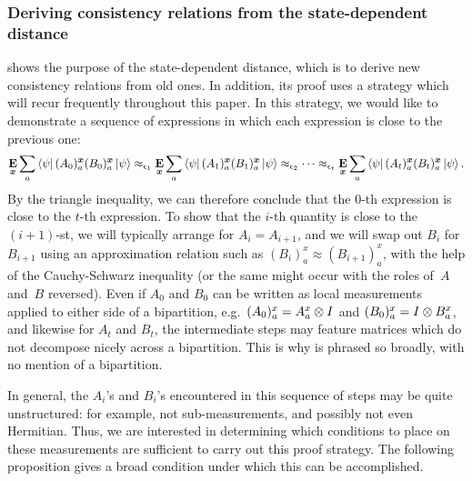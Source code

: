 \subsubsection{Deriving consistency relations from the state-dependent distance}
\label{sec:consistency-from-state-dependent-distance}

 shows the purpose of the state-dependent distance,
which is to derive new consistency relations from old ones.
In addition, its proof uses a strategy
which will recur frequently throughout this paper.
In this strategy, we would like to demonstrate a sequence of 
expressions in which each expression is close to the previous one:
\begin{equation*}
\mathop{\bf E\/}_{{\boldsymbol{x}}} \sum_a \bra{\psi} (A_0)^{{\boldsymbol{x}}}_a (B_0)^{{\boldsymbol{x}}}_a \ket{\psi}
\approx_{\epsilon_1} \mathop{\bf E\/}_{{\boldsymbol{x}}} \sum_a \bra{\psi} (A_1)^{{\boldsymbol{x}}}_a (B_1)^{{\boldsymbol{x}}}_a \ket{\psi}
\approx_{\epsilon_2} \cdots
\approx_{\epsilon_t} \mathop{\bf E\/}_{{\boldsymbol{x}}} \sum_a \bra{\psi} (A_t)^{{\boldsymbol{x}}}_a (B_t)^{{\boldsymbol{x}}}_a \ket{\psi}.
\end{equation*}
By the triangle inequality, we can therefore conclude that the $0$-th expression
is close to the $t$-th expression.
To show that the $i$-th quantity is close to the $(i+1)$-st,
we will typically arrange for $A_{i} = A_{i+1}$,
and we will swap out $B_i$ for $B_{i+1}$
using an approximation relation such as $(B_i)^x_a \approx (B_{i+1})^x_a$,
with the help of the Cauchy-Schwarz inequality
(or the same might occur with the roles of~$A$ and~$B$ reversed). 
Even if $A_0$ and $B_0$ can be written as local measurements applied to either side of a bipartition,
e.g.\ $(A_0)^x_a = A^x_a \otimes I$ and $(B_0)^x_a = I \otimes B^x_a$,
and likewise for $A_t$ and $B_t$,
the intermediate steps may feature matrices which do not decompose nicely across a bipartition.
This is why  is phrased so broadly,
with no mention of a bipartition.

In general, the $A_i$'s and $B_i$'s encountered in this sequence of steps
may be quite unstructured: for example, not sub-measurements,
and possibly not even Hermitian.
Thus, we are interested in determining which conditions
to place on these measurements are sufficient to carry out this proof strategy.
The following proposition gives a broad condition under which this can be accomplished.

